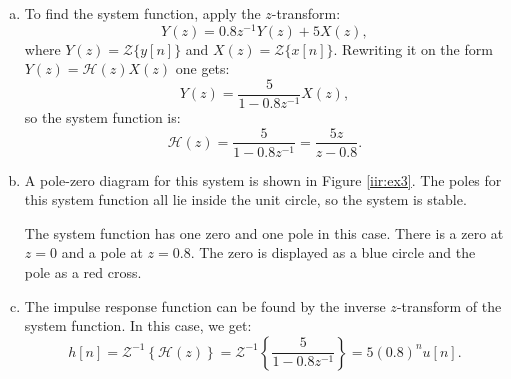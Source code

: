 \begin{enumerate}
\begin{enumerate}[a)]
              \item To find the system function, apply the $z$-transform:
                    \[Y(z) = 0.8z^{-1}Y(z) + 5X(z),\]
                    where $Y(z)=\mathcal{Z}\{y[n]\}$ and $X(z)=\mathcal{Z}\{x[n]\}$.
                    Rewriting it on the form $Y(z)=\mathcal{H}(z)X(z)$ one gets:
                    \[Y(z)=\frac{5}{1 - 0.8z^{-1}}X(z),\]
                    so the system function is:
                    \[\mathcal{H}(z)=\frac{5}{1 - 0.8z^{-1}} = \frac{5z}{z - 0.8}.\]

              \item A pole-zero diagram for this system is shown in Figure \ref{iir:ex3}.
                    The poles for this system function all lie inside the unit circle, so the system is stable.
                    \begin{marginfigure}
                        \begin{center}
                        \end{center}
                        \caption{The system function has one zero and one pole in this case. There is a zero at $z=0$ and a pole at $z=0.8$.
                            The zero is displayed as a blue circle and the pole as a red cross.}
                        \label{iir:ex3}
                    \end{marginfigure}
              \item The impulse response function can be found by the inverse $z$-transform of the system function.
                    In this case, we get:
                    \[h[n] = \mathcal{Z}^{-1}\left\{\mathcal{H}(z)\right\} = \mathcal{Z}^{-1}\left\{\frac{5}{1 - 0.8z^{-1}}\right\} = 5(0.8)^{n}u[n].\]


\end{enumerate}
\end{enumerate}
